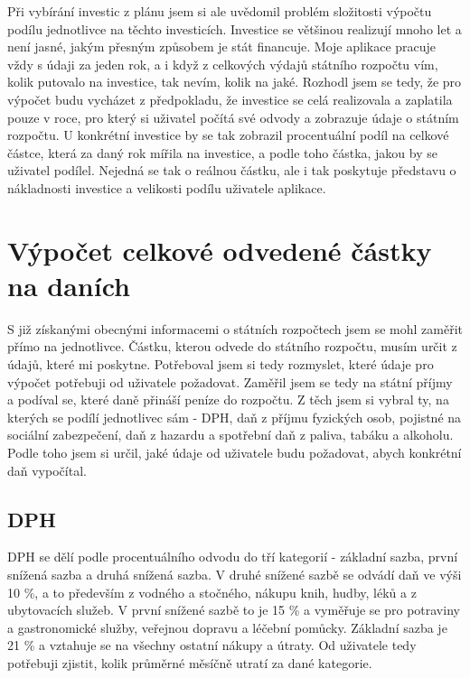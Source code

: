 \documentclass[11pt,a4paper,twoside,openright]{report}
\begin{document}
Při vybírání investic z plánu jsem si ale uvědomil problém složitosti výpočtu podílu
jednotlivce na těchto investicích. Investice se většinou realizují mnoho let a není jasné,
jakým přesným způsobem je stát financuje. Moje aplikace pracuje vždy s údaji za jeden rok,
a i když z celkových výdajů státního rozpočtu vím, kolik putovalo na investice, tak nevím,
kolik na jaké. Rozhodl jsem se tedy, že pro výpočet budu vycházet z předpokladu, že investice
se celá realizovala a zaplatila pouze v roce, pro který si uživatel počítá své odvody a
zobrazuje údaje o státním rozpočtu. U konkrétní investice by se tak zobrazil procentuální
podíl na celkové částce, která za daný rok mířila na investice, a podle toho částka, jakou
by se uživatel podílel. Nejedná se tak o reálnou částku, ale i tak poskytuje představu o
nákladnosti investice a velikosti podílu uživatele aplikace.

\section{Výpočet celkové odvedené částky na daních}

S již získanými obecnými informacemi o státních rozpočtech jsem se mohl zaměřit přímo na jednotlivce.
Částku, kterou odvede do státního rozpočtu, musím určit z údajů, které mi poskytne. Potřeboval jsem si tedy
 rozmyslet, které údaje pro výpočet potřebuji od uživatele požadovat. Zaměřil jsem se tedy na státní příjmy
a podíval se, které daně přináší peníze do rozpočtu. Z těch jsem si vybral ty, na kterých se podílí jednotlivec
sám - DPH, daň z příjmu fyzických osob, pojistné na sociální zabezpečení, daň z hazardu a spotřební daň z
paliva, tabáku a alkoholu. Podle toho jsem si určil, jaké údaje od uživatele budu požadovat, abych konkrétní
daň vypočítal.

\subsection{DPH}

DPH se dělí podle procentuálního odvodu do tří kategorií - základní sazba, první snížená
sazba a druhá snížená sazba. V druhé snížené sazbě se odvádí daň ve výši 10 \%, a to především
z vodného a stočného, nákupu knih, hudby, léků a z ubytovacích služeb. V první snížené sazbě to
je 15 \% a vyměřuje se pro potraviny a gastronomické služby, veřejnou dopravu a léčební pomůcky.
Základní sazba je 21 \% a vztahuje se na všechny ostatní nákupy a útraty. Od uživatele
tedy potřebuji zjistit, kolik průměrné měsíčně utratí za dané kategorie.
\end{document}
